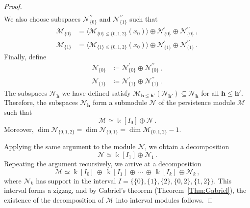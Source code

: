 \documentclass[reqno,12pt]{amsart}
\newcommand{\cM}{\mathcal{M}}
\newcommand{\cN}{\mathcal{N}}
\newcommand{\0}{\mathbf 0}
\newcommand{\h}{\mathbf{h}}
\theoremstyle{definition}
\begin{document}
\begin{proof}
\[\begin{aligned}
    \end{aligned}
    \]
    We also choose subspaces $\cN_{\{0\}}^{\prime\prime}$ and $\cN_{\{1\}}^{\prime\prime}$ such that
    \[
    \begin{aligned}
        \cM_{\{0\}}&=\langle \cM_{\{0\}\leq\{0,1,2\}}(x_0)\rangle \oplus \cN_{\{0\}}^{\prime} \oplus \cN_{\{0\}}^{\prime\prime}\, ,\\[1.5ex]
        \cM_{\{1\}}&=\langle \cM_{\{1\}\leq\{0,1,2\}}(x_0)\rangle \oplus \cN_{\{1\}}^{\prime} \oplus \cN_{\{1\}}^{\prime\prime} \, .
    \end{aligned}
    \]
    Finally, define
    \[
    \begin{aligned}
        \cN_{\{0\}}&\coloneqq \cN_{\{0\}}^{\prime} \oplus \cN_{\{0\}}^{\prime\prime}\,,\\[1.5ex]
       \cN_{\{1\}}&\coloneqq \cN_{\{1\}}^{\prime} \oplus \cN_{\{1\}}^{\prime\prime}\, .
    \end{aligned}
    \]
    The subspaces $\cN_{\h}$ we have defined satisfy $\cM_{\h\leq\h'}(\cN_{\h'})\subseteq \cN_{\h}$ for all $\h\leq \h'$. Therefore, the subspaces $\cN_{\h}$ form a submodule $\cN$ of the persistence module $\cM$ such that
    \[
    \cM \simeq \Bbbk[I_0]\oplus\cN\, .
    \]
    Moreover, $\dim\cN_{\{0,1,2\}}=\dim\cN_{\{0,1\}}=\dim \cM_{\{0,1,2\}}-1$.

    Applying the same argument to the module $\cN$, we obtain a decomposition
    \[
    \cN\simeq \Bbbk[I_1]\oplus \cN_1\, .
    \]
    Repeating the argument recursively, we arrive at a decomposition
    \begin{equation}\label{Eq:MkDescomposicionDim2}
        \cM \simeq \Bbbk[I_0] \, \oplus\, \Bbbk[I_1]\,\oplus\,\cdots\,\oplus\, \Bbbk[I_k]\,\oplus \cN_k\, ,
    \end{equation}
    where $\cN_k$ has support in the interval $I=\{\{0\},\{1\},\{2\},\{0,2\},\{1,2\}\}$. This interval forms a zigzag, and by Gabriel's theorem (Theorem~\ref{Thm:Gabriel}), the existence of the decomposition of $\cM$ into interval modules follows. 
\end{proof}
\end{document}
